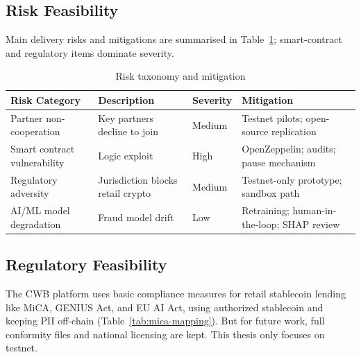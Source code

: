 \documentclass[12pt, a4paper]{report}
\newcommand{\tableheadcolor}{\rowcolor{TableHeadBg}}
\begin{document}
\vspace{2pt}

\subsection{Risk Feasibility}

Main delivery risks and mitigations are summarised in Table~\ref{tab:risk-taxonomy}; smart-contract and regulatory items dominate severity.

\begin{table}[H]
\centering
\caption[Risk taxonomy and mitigation]{Risk taxonomy and mitigation}
\label{tab:risk-taxonomy}
\begin{tabular}{p{3cm}p{4cm}p{1.5cm}p{5cm}}
\toprule
\tableheadcolor
\textbf{Risk Category} & \textbf{Description} & \textbf{Severity} & \textbf{Mitigation} \\
\midrule
Partner non-cooperation & Key partners decline to join & Medium & Testnet pilots; open-source replication \\
Smart contract vulnerability & Logic exploit & High & OpenZeppelin; audits; pause mechanism \\
Regulatory adversity & Jurisdiction blocks retail crypto & Medium & Testnet-only prototype; sandbox path \\
AI/ML model degradation & Fraud model drift & Low & Retraining; human-in-the-loop; SHAP review \\
\bottomrule
\end{tabular}
\end{table}

\vspace{2pt}

\subsection{Regulatory Feasibility}
\label{sec:mica-compliance}

The CWB platform uses basic compliance measures for retail stablecoin lending like MiCA, GENIUS Act, and EU AI Act, using authorized stablecoin and keeping PII off-chain (Table~\ref{tab:mica-mapping}). But for future work, full conformity files and national licensing are kept. This thesis only focuses on testnet.
\end{document}
